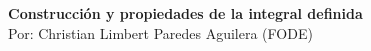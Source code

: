 \begin{center}
\LARGE\textbf{Construcción y propiedades de la integral definida}\\
\normalsize
\vspace{.3cm}
Por: Christian Limbert Paredes Aguilera (FODE)
\end{center}
\vspace{.5cm}

\begin{flushleft}
\end{flushleft}
\vspace{.5cm}
